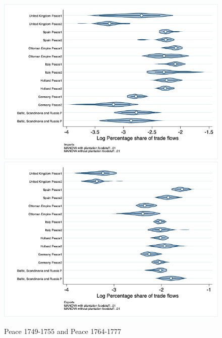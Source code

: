\documentclass[12pt,a4paper,notitlepage,english]{article}
\begin{document}
\begin{figure}
\centering
\caption{Peace 1749-1755 and Peace 1764-1777}
\label{seven_peace1764_1777_nat_distr_pays7}
\includegraphics[scale=.4]{peace1749_1755_peace1764_1777_nat_distr_Ipays7}
\includegraphics[scale=.4]{peace1749_1755_peace1764_1777_nat_distr_Xpays7}
\end{figure}
\end{document}
